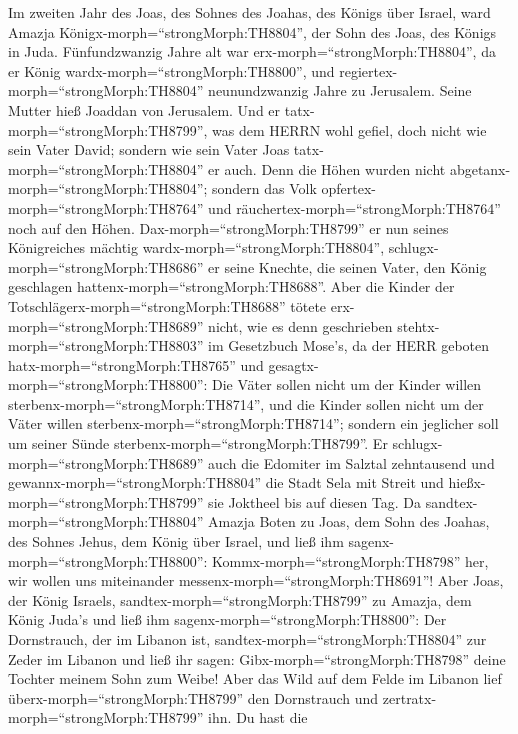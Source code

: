 Im zweiten Jahr des Joas, des Sohnes des Joahas, des Königs
über Israel, ward Amazja Königx-morph=``strongMorph:TH8804'', der Sohn
des Joas, des Königs in Juda.  Fünfundzwanzig Jahre alt war
erx-morph=``strongMorph:TH8804'', da er König
wardx-morph=``strongMorph:TH8800'', und
regiertex-morph=``strongMorph:TH8804'' neunundzwanzig Jahre zu
Jerusalem. Seine Mutter hieß Joaddan von Jerusalem.  Und er
tatx-morph=``strongMorph:TH8799'', was dem HERRN wohl gefiel, doch nicht
wie sein Vater David; sondern wie sein Vater Joas
tatx-morph=``strongMorph:TH8804'' er auch.  Denn die Höhen
wurden nicht abgetanx-morph=``strongMorph:TH8804''; sondern das Volk
opfertex-morph=``strongMorph:TH8764'' und
räuchertex-morph=``strongMorph:TH8764'' noch auf den Höhen. 
Dax-morph=``strongMorph:TH8799'' er nun seines Königreiches mächtig
wardx-morph=``strongMorph:TH8804'', schlugx-morph=``strongMorph:TH8686''
er seine Knechte, die seinen Vater, den König geschlagen
hattenx-morph=``strongMorph:TH8688''.  Aber die Kinder der
Totschlägerx-morph=``strongMorph:TH8688'' tötete
erx-morph=``strongMorph:TH8689'' nicht, wie es denn geschrieben
stehtx-morph=``strongMorph:TH8803'' im Gesetzbuch Mose's, da der HERR
geboten hatx-morph=``strongMorph:TH8765'' und
gesagtx-morph=``strongMorph:TH8800'': Die Väter sollen nicht um der
Kinder willen sterbenx-morph=``strongMorph:TH8714'', und die Kinder
sollen nicht um der Väter willen sterbenx-morph=``strongMorph:TH8714'';
sondern ein jeglicher soll um seiner Sünde
sterbenx-morph=``strongMorph:TH8799''.  Er
schlugx-morph=``strongMorph:TH8689'' auch die Edomiter im Salztal
zehntausend und gewannx-morph=``strongMorph:TH8804'' die Stadt Sela mit
Streit und hießx-morph=``strongMorph:TH8799'' sie Joktheel bis auf
diesen Tag.  Da sandtex-morph=``strongMorph:TH8804'' Amazja
Boten zu Joas, dem Sohn des Joahas, des Sohnes Jehus, dem König über
Israel, und ließ ihm sagenx-morph=``strongMorph:TH8800'':
Kommx-morph=``strongMorph:TH8798'' her, wir wollen uns miteinander
messenx-morph=``strongMorph:TH8691''!  Aber Joas, der König
Israels, sandtex-morph=``strongMorph:TH8799'' zu Amazja, dem König
Juda's und ließ ihm sagenx-morph=``strongMorph:TH8800'': Der
Dornstrauch, der im Libanon ist, sandtex-morph=``strongMorph:TH8804''
zur Zeder im Libanon und ließ ihr sagen:
Gibx-morph=``strongMorph:TH8798'' deine Tochter meinem Sohn zum Weibe!
Aber das Wild auf dem Felde im Libanon lief
überx-morph=``strongMorph:TH8799'' den Dornstrauch und
zertratx-morph=``strongMorph:TH8799'' ihn.  Du hast die
